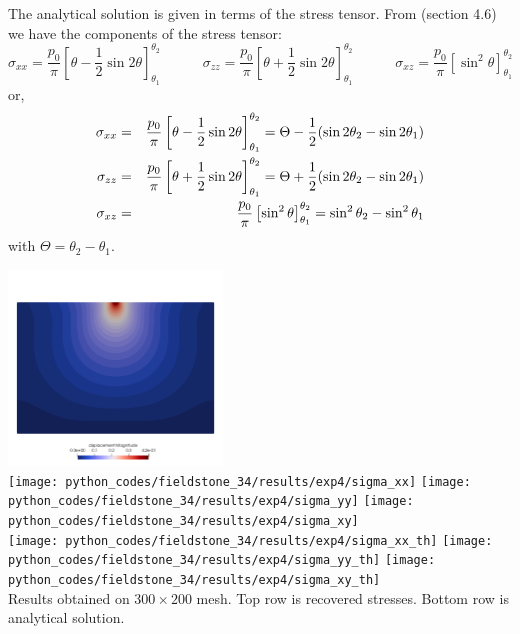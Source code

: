 The analytical solution is given in terms of the stress tensor.
From \textcite{dase96}(section 4.6) we have the components of the stress tensor:
\[
\sigma_{xx}=\frac{p_0}{\pi}\left[ \theta - \frac{1}{2}\sin 2\theta  \right]^{\theta_2}_{\theta_1}
\quad\quad\quad
\sigma_{zz}=\frac{p_0}{\pi}\left[ \theta + \frac{1}{2}\sin 2\theta  \right]^{\theta_2}_{\theta_1}
\quad\quad\quad
\sigma_{xz}=\frac{p_0}{\pi}\left[ \sin^2 \theta  \right]^{\theta_2}_{\theta_1}
\]
or, 
\begin{eqnarray}
{\sigma}_{xx}&=&\frac{p_0}{\pi}\left[ \theta - \frac{1}{2}\sin 2\theta  \right]^{\theta_2}_{\theta_1} = \Theta - \frac{1}{2} ( \sin 2\theta_2 - \sin 2\theta_1) \nonumber\\
{\sigma}_{zz}&=&\frac{p_0}{\pi}\left[ \theta + \frac{1}{2}\sin 2\theta  \right]^{\theta_2}_{\theta_1} = \Theta + \frac{1}{2} ( \sin 2\theta_2 - \sin 2\theta_1) \nonumber\\
{\sigma}_{xz}&=&\frac{p_0}{\pi}\left[ \sin^2 \theta  \right]^{\theta_2}_{\theta_1} =  \sin^2 \theta_2 - \sin^2 \theta_1 \nonumber
\end{eqnarray}
with $\Theta=\theta_2-\theta_1$. 

\newpage
\begin{center}
\includegraphics[width=5.7cm]{python_codes/fieldstone_34/results/exp4/disp}\\
\texttt{[image: python\_codes/fieldstone\_34/results/exp4/sigma\_xx]}
\texttt{[image: python\_codes/fieldstone\_34/results/exp4/sigma\_yy]}
\texttt{[image: python\_codes/fieldstone\_34/results/exp4/sigma\_xy]}\\
\texttt{[image: python\_codes/fieldstone\_34/results/exp4/sigma\_xx\_th]}
\texttt{[image: python\_codes/fieldstone\_34/results/exp4/sigma\_yy\_th]}
\texttt{[image: python\_codes/fieldstone\_34/results/exp4/sigma\_xy\_th]}\\
{\captionfont Results obtained on $300\times 200$ mesh. Top row is recovered stresses. 
Bottom row is analytical solution.}
\end{center}

